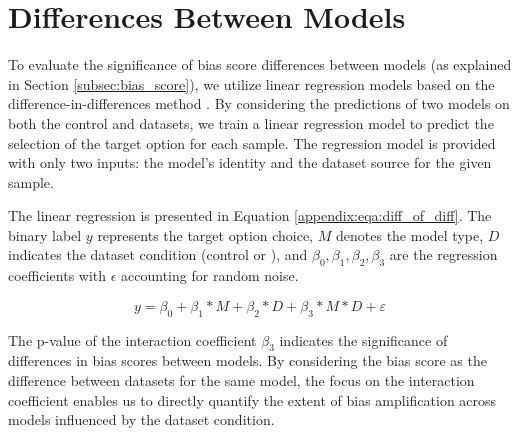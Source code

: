\section{Differences Between Models}
\label{appendix:sec:diff_between_models}
%

To evaluate the significance of bias score differences between models (as explained in Section \ref{subsec:bias_score}), we utilize linear regression models based on the difference-in-differences method \cite{dimick2014methods}.
By considering the predictions of two models on both the control and \biaseddataset{} datasets, we train a linear regression model to predict the selection of the target option for each sample.
The regression model is provided with only two inputs: the model's identity and the dataset source for the given sample.

The linear regression is presented in Equation \ref{appendix:eqa:diff_of_diff}.
The binary label $y$ represents the target option choice, $M$ denotes the model type, $D$ indicates the dataset condition (control or \biaseddataset{}), and $\beta_{0}, \beta_{1}, \beta_{2}, \beta_{3}$ are the regression coefficients with $\epsilon$ accounting for random noise.


\begin{equation}
\label{appendix:eqa:diff_of_diff}
    y = \beta_{0} + \beta_{1} * M + \beta_{2} * D + \beta_{3} * M * D + \varepsilon
\end{equation}

The p-value of the interaction coefficient $\beta_{3}$ indicates the significance of differences in bias scores between models.    
By considering the bias score as the difference between datasets for the same model, the focus on the interaction coefficient enables us to directly quantify the extent of bias amplification across models influenced by the dataset condition.

